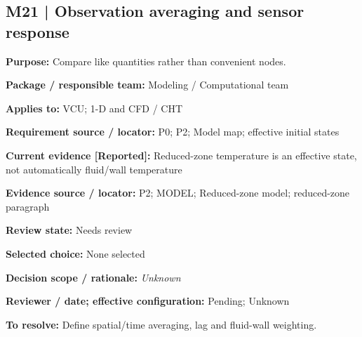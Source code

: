 \documentclass[11pt]{article}
\begin{document}
\begin{minipage}{\textwidth}\small\setlength{\parskip}{2pt}
\subsection*{M21 | Observation averaging and sensor response}
\textbf{Purpose:} Compare like quantities rather than convenient nodes.\par
\textbf{Package / responsible team:} Modeling / Computational team\par
\textbf{Applies to:} VCU; 1-D and CFD / CHT\par
\textbf{Requirement source / locator:} P0; P2; Model map; effective initial states\par
\textbf{Current evidence [Reported]:} Reduced-zone temperature is an effective state, not automatically fluid/wall temperature\par
\textbf{Evidence source / locator:} P2; MODEL; Reduced-zone model; reduced-zone paragraph\par
\textbf{Review state:} Needs review\par
\textbf{Selected choice:} None selected\par
\textbf{Decision scope / rationale:} \textit{Unknown}\par
\textbf{Reviewer / date; effective configuration:} Pending; Unknown\par
\textbf{To resolve:} Define spatial/time averaging, lag and fluid-wall weighting.\par
\end{minipage}\par\vspace{5pt}
\end{document}
